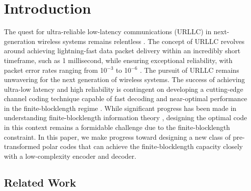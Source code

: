 \documentclass[conference]{IEEEtran}
\begin{document}

\section{Introduction}
 The quest for ultra-reliable low-latency communications (URLLC) in next-generation wireless systems remains relentless \cite{Wang-6G-Survey, tataria-6G-URLLC, zhang-6G-URLLC, david-6G-URLLC}. The concept of URLLC revolves around achieving lightning-fast data packet delivery within an incredibly short timeframe, such as 1 millisecond, while ensuring exceptional reliability, with packet error rates ranging from 10$^{-3}$ to 10$^{-6}$ \cite{Chen-URLLC}. The pursuit of URLLC remains unwavering for the next generation of wireless systems. The success of achieving ultra-low latency and high reliability is contingent on developing a cutting-edge channel coding technique capable of fast decoding and near-optimal performance in the finite-blocklength regime \cite{shirvanimoghaddam19, yue23}. While significant progress has been made in understanding finite-blocklength information theory \cite{polyanskiy-finite, Yang-finite-mimo-fading, Makki-finite-HARQ}, designing the optimal code in this context remains a formidable challenge due to the finite-blocklength constraint. In this paper, we make progress toward designing a new class of pre-transformed polar codes that can achieve the finite-blocklength capacity closely with a low-complexity encoder and decoder.
 


\subsection{Related Work}
 
\end{document}
